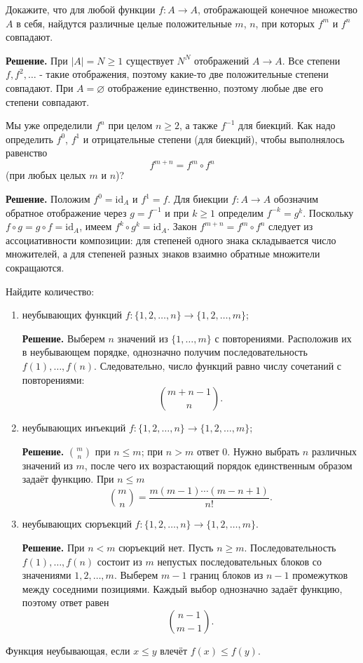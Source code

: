\begin{problems}
\item Докажите, что для любой функции $f\colon A\to A$, отображающей конечное множество $A$ в себя, найдутся различные целые положительные $m$, $n$, при которых $f^m$ и $f^n$ совпадают.
\par\smallskip\noindent\textbf{Решение.} При $|A|=N\ge1$ существует $N^N$ отображений $A\to A$. Все степени $f,f^2,\ldots$ - такие отображения, поэтому какие-то две положительные степени совпадают. При $A=\varnothing$ отображение единственно, поэтому любые две его степени совпадают.\par

\item Мы уже определили $f^n$ при целом $n\geqslant 2$, а также $f^{-1}$ для биекций. Как надо определить $f^0$, $f^1$ и отрицательные степени (для биекций), чтобы выполнялось равенство
\[
f^{m+n}=f^m\circ f^n
\]
(при любых целых $m$ и $n$)?
\par\smallskip\noindent\textbf{Решение.} Положим $f^0=\mathrm{id}_A$ и $f^1=f$. Для биекции $f\colon A\to A$ обозначим обратное отображение через $g=f^{-1}$ и при $k\ge1$ определим $f^{-k}=g^k$. Поскольку $f\circ g=g\circ f=\mathrm{id}_A$, имеем $f^k\circ g^k=\mathrm{id}_A$. Закон $f^{m+n}=f^m\circ f^n$ следует из ассоциативности композиции: для степеней одного знака складывается число множителей, а для степеней разных знаков взаимно обратные множители сокращаются.\par

\item Найдите количество:
\begin{enumerate}[label=\cyralph*)]
  \item неубывающих функций $f\colon\{1,2,\ldots,n\}\to\{1,2,\ldots,m\}$;
  \par\smallskip\noindent\textbf{Решение.} Выберем $n$ значений из $\{1,\ldots,m\}$ с повторениями. Расположив их в неубывающем порядке, однозначно получим последовательность $f(1),\ldots,f(n)$. Следовательно, число функций равно числу сочетаний с повторениями:
  \[
  \binom{m+n-1}{n}.
  \]\par
  \item неубывающих инъекций $f\colon\{1,2,\ldots,n\}\to\{1,2,\ldots,m\}$;
  \par\smallskip\noindent\textbf{Решение.} $\binom mn$ при $n\le m$; при $n>m$ ответ $0$. Нужно выбрать $n$ различных значений из $m$, после чего их возрастающий порядок единственным образом задаёт функцию. При $n\le m$
  \[
  \binom mn=\frac{m(m-1)\cdots(m-n+1)}{n!}.
  \]\par
  \item неубывающих сюръекций $f\colon\{1,2,\ldots,n\}\to\{1,2,\ldots,m\}$.
  \par\smallskip\noindent\textbf{Решение.} При $n<m$ сюръекций нет. Пусть $n\ge m$. Последовательность $f(1),\ldots,f(n)$ состоит из $m$ непустых последовательных блоков со значениями $1,2,\ldots,m$. Выберем $m-1$ границ блоков из $n-1$ промежутков между соседними позициями. Каждый выбор однозначно задаёт функцию, поэтому ответ равен
  \[
  \binom{n-1}{m-1}.
  \]\par
\end{enumerate}
Функция неубывающая, если $x\leqslant y$ влечёт $f(x)\leqslant f(y)$.


\end{problems}
